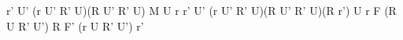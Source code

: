 r' U' (r U' R' U)(R U' R' U) M U r
r' U' (r U' R' U)(R U' R' U)(R r') U r
F (R U R' U') R F' (r U R' U') r'
